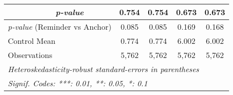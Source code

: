 \begin{tabular}{cccccc}
\multicolumn{1}{l}{} & \multicolumn{1}{c}{\scriptsize{\textit{p-value}}} & \multicolumn{1}{c}{0.754} & \multicolumn{1}{c}{0.754} & \multicolumn{1}{c}{0.673} & \multicolumn{1}{c}{0.673} \\
\midrule
\multicolumn{2}{l}{\textit{p-value} (Reminder vs Anchor)}& \multicolumn{1}{c}{0.085}& \multicolumn{1}{c}{0.085}& \multicolumn{1}{c}{0.169}& \multicolumn{1}{c}{0.168}\\
\multicolumn{2}{l}{Control Mean} &0.774&0.774&6.002&6.002\\
\multicolumn{2}{l}{Observations} &5,762&5,762&5,762&5,762\\
\midrule
\midrule \midrule
\multicolumn{6}{l}{\emph{Heteroskedasticity-robust standard-errors in parentheses}}\\
\multicolumn{6}{l}{\emph{Signif. Codes: ***: 0.01, **: 0.05, *: 0.1}}\\

\end{tabular}
